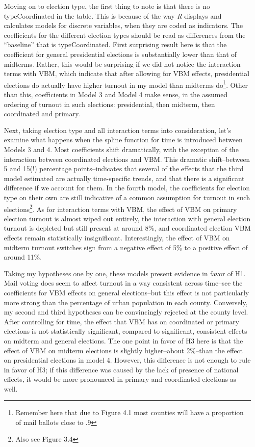 \documentclass[]{article}
\let\rmarkdownfootnote\footnote%
\def\footnote{\protect\rmarkdownfootnote}
\begin{document}
Moving on to election type, the first thing to note is that there is no
typeCoordinated in the table. This is because of the way \textit{R}
displays and calculates models for discrete variables, when they are
coded as indicators. The coefficients for the different election types
should be read as differences from the ``baseline'' that is
typeCoordinated. First surprising result here is that the coefficient
for general presidential elections is substantially lower than that of
midterms. Rather, this would be surprising if we did not notice the
interaction terms with VBM, which indicate that after allowing for VBM
effects, presidential elections do actually have higher turnout in my
model than midterms do\footnote{Remember here that due to Figure 4.1
  most counties will have a proportion of mail ballots close to .9}.
Other than this, coefficients in Model 3 and Model 4 make sense, in the
assumed ordering of turnout in such elections: presidential, then
midterm, then coordinated and primary.

Next, taking election type and all interaction terms into consideration,
let's examine what happens when the spline function for time is
introduced between Models 3 and 4. Most coefficients shift dramatically,
with the exception of the interaction between coordinated elections and
VBM. This dramatic shift--between 5 and 15(!) percentage
points--indicates that several of the effects that the third model
estimated are actually time-specific trends, and that there is a
significant difference if we account for them. In the fourth model, the
coefficients for election type on their own are still indicative of a
common assumption for turnout in such elections\footnote{Also see Figure
  3.4}. As for interaction terms with VBM, the effect of VBM on primary
election turnout is almost wiped out entirely, the interaction with
general election turnout is depleted but still present at around 8\%,
and coordinated election VBM effects remain statistically insignificant.
Interestingly, the effect of VBM on midterm turnout switches sign from a
negative effect of 5\% to a positive effect of around 11\%.

Taking my hypotheses one by one, these models present evidence in favor
of H1. Mail voting does seem to affect turnout in a way consistent
across time--see the coefficients for VBM effects on general
elections--but this effect is not particularly more strong than the
percentage of urban population in each county. Conversely, my second and
third hypotheses can be convincingly rejected at the county level. After
controlling for time, the effect that VBM has on coordinated or primary
elections is not statistically significant, compared to significant,
consistent effects on midterm and general elections. The one point in
favor of H3 here is that the effect of VBM on midterm elections is
slightly higher--about 2\%--than the effect on presidential elections in
model 4. However, this difference is not enough to rule in favor of H3;
if this difference was caused by the lack of presence of national
effects, it would be more pronounced in primary and coordinated
elections as well.
\end{document}
